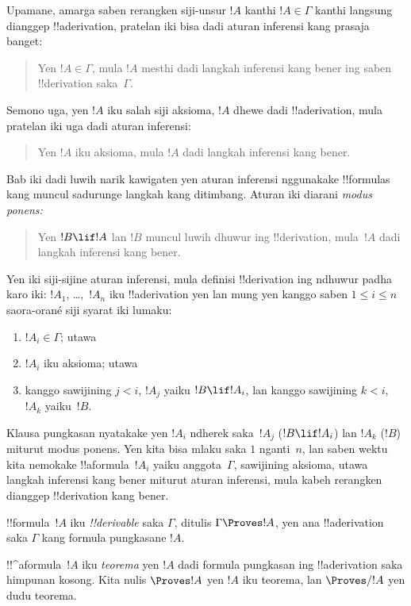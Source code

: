 \documentclass[../../../include/open-logic-section]{subfiles}
\begin{document}
Upamane, amarga saben rerangken siji-unsur $!A$ kanthi $!A \in \Gamma$
kanthi langsung dianggep !!a{derivation}, pratelan iki bisa dadi aturan
inferensi kang prasaja banget:
\begin{quote}
  Yen $!A \in \Gamma$, mula $!A$ mesthi dadi langkah inferensi kang
  bener ing saben !!{derivation} saka~$\Gamma$.
\end{quote}
Semono uga, yen $!A$ iku salah siji aksioma, $!A$ dhewe dadi
!!a{derivation}, mula pratelan iki uga dadi aturan inferensi:
\begin{quote}
  Yen $!A$ iku aksioma, mula $!A$ dadi langkah inferensi kang bener.
\end{quote}
Bab iki dadi luwih narik kawigaten yen aturan inferensi nggunakake
!!{formula}s kang muncul sadurunge langkah kang ditimbang. Aturan iki
diarani \emph{modus ponens:}
\begin{quote}
  Yen $!B \lif !A$ lan $!B$ muncul luwih dhuwur ing !!{derivation},
  mula~$!A$ dadi langkah inferensi kang bener.
\end{quote}
Yen iki siji-sijine aturan inferensi, mula definisi !!{derivation} ing
ndhuwur padha karo iki: $!A_1$, \dots,~$!A_n$ iku !!a{derivation}
yen lan mung yen kanggo saben $1\le i\le n$ saora-orané siji syarat iki
lumaku:
\begin{enumerate}
\item $!A_i \in \Gamma$; utawa
\item $!A_i$ iku aksioma; utawa
\item kanggo sawijining $j < i$, $!A_j$ yaiku $!B \lif !A_i$, lan
  kanggo sawijining $k < i$, $!A_k$ yaiku~$!B$.
\end{enumerate}
Klausa pungkasan nyatakake yen $!A_i$ ndherek saka~$!A_j$ ($!B \lif
!A_i$) lan $!A_k$ ($!B$) miturut modus ponens. Yen kita bisa mlaku
saka $1$ nganti~$n$, lan saben wektu kita nemokake !!a{formula}~$!A_i$
yaiku anggota~$\Gamma$, sawijining aksioma, utawa langkah inferensi
kang bener miturut aturan inferensi, mula kabeh rerangken dianggep
!!{derivation} kang bener.

\begin{defn}[!!^{derivability}]
!!{formula}~$!A$ iku \emph{!!{derivable}} saka $\Gamma$, ditulis
$\Gamma \Proves !A$, yen ana !!a{derivation} saka $\Gamma$ kang
formula pungkasane $!A$.
\end{defn}

\begin{defn}[Teorema]
!!^a{formula}~$!A$ iku \emph{teorema} yen $!A$ dadi formula pungkasan
ing !!a{derivation} saka himpunan kosong. Kita nulis $\Proves !A$
yen $!A$ iku teorema, lan $\Proves/ !A$ yen dudu teorema.
\end{defn}
\end{document}
